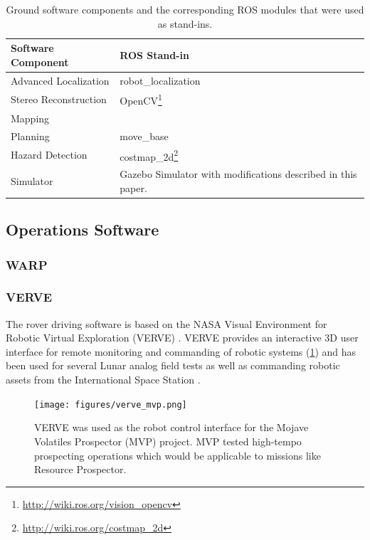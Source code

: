 \documentclass[twocolumn,letterpaper]{IEEEAerospaceCLS}  %
\begin{document}
\begin{table}[htp]
\caption{Ground software components and the corresponding ROS modules that were used as stand-ins.\label{tbl:ground-software-components}}
\begin{tabular}{l|p{4cm}}
\textbf{Software Component} & \textbf{ROS Stand-in} \\
\hline 
Advanced Localization & robot\_localization\\
Stereo Reconstruction & OpenCV\footnote{\url{http://wiki.ros.org/vision_opencv}}\\
Mapping & \\
Planning & move\_base\\
Hazard Detection & costmap\_2d\footnote{\url{http://wiki.ros.org/costmap_2d}}\\
Simulator & Gazebo Simulator with modifications described in this paper.\\
\hline
\end{tabular}
\end{table}



\subsection{Operations Software}

\subsubsection{WARP}

\cite{trimble2016open} 

\subsubsection{VERVE}

The rover driving software is based on the NASA Visual Environment for Robotic Virtual Exploration (VERVE) \cite{lee2013reusable}. VERVE provides an interactive 3D user interface for remote monitoring and commanding of robotic systems (\cref{fig:verve-mvp}) and has been used for several Lunar analog field tests \cite{deans2009robotic} \cite{fong2010robotic} as well as commanding robotic assets from the International Space Station \cite{bualat2013surface}.

\begin{figure}[htp]
\centering
\texttt{[image: figures/verve\_mvp.png]}
\caption{VERVE was used as the robot control interface for the Mojave Volatiles Prospector (MVP) project.  MVP tested high-tempo prospecting operations which would be applicable to missions like Resource Prospector.\label{fig:verve-mvp}}
\end{figure}
\end{document}

